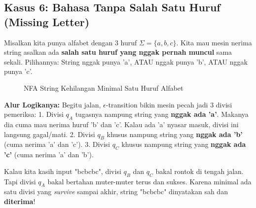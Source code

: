 \documentclass[12pt,a4paper]{article}
\begin{document}
\subsection{Kasus 6: Bahasa Tanpa Salah Satu Huruf (Missing Letter)}
Misalkan kita punya alfabet dengan 3 huruf $\Sigma=\{a, b, c\}$. Kita mau mesin nerima string asalkan ada \textbf{salah satu huruf yang nggak pernah muncul} sama sekali.
Pilihannya: String nggak punya 'a', ATAU nggak punya 'b', ATAU nggak punya 'c'.

\begin{figure}[h]
    \centering
    \caption{NFA String Kehilangan Minimal Satu Huruf Alfabet}
\end{figure}

\textbf{Alur Logikanya:}
Begitu jalan, $\epsilon$-transition bikin mesin pecah jadi 3 divisi pemeriksa:
1. Divisi $q_A$ tugasnya nampung string yang \textbf{nggak ada 'a'}. Makanya dia cuma mau nerima huruf 'b' dan 'c'. Kalau ada 'a' nyasar masuk, divisi ini langsung gagal/mati.
2. Divisi $q_B$ khusus nampung string yang \textbf{nggak ada 'b'} (cuma nerima 'a' dan 'c').
3. Divisi $q_C$ khusus nampung string yang \textbf{nggak ada 'c'} (cuma nerima 'a' dan 'b').

Kalau kita kasih input "bcbcbc", divisi $q_B$ dan $q_C$ bakal rontok di tengah jalan. Tapi divisi $q_A$ bakal bertahan muter-muter terus dan sukses. Karena minimal ada satu divisi yang \textit{survive} sampai akhir, string "bcbcbc" dinyatakan sah dan \textbf{diterima}!
\end{document}
